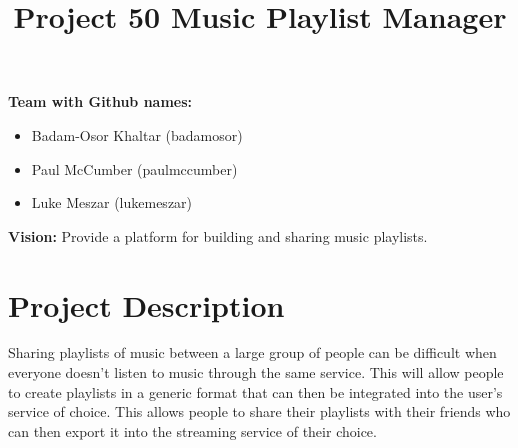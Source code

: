 \documentclass[12pt]{article}
\title{Project 50 Music Playlist Manager}
\date{}
\begin{document}
\maketitle
\noindent
\textbf{Team with Github names:}
\begin{itemize}[leftmargin=0.0cm,labelsep=0.2cm]
	\item[] Badam-Osor Khaltar (badamosor)
	\item[] Paul McCumber (paulmccumber)
	\item[] Luke Meszar (lukemeszar)
\end{itemize}
\textbf{Vision:} Provide a platform for building and sharing music playlists.
\section{Project Description}
Sharing playlists of music between a large group of people can be difficult when
everyone doesn't listen to music through the same service. This will allow people to create
playlists in a generic format that can then be integrated into the user’s service of choice. This allows people to share their playlists with their friends who can then export it into the streaming service of their choice. 
\end{document}
